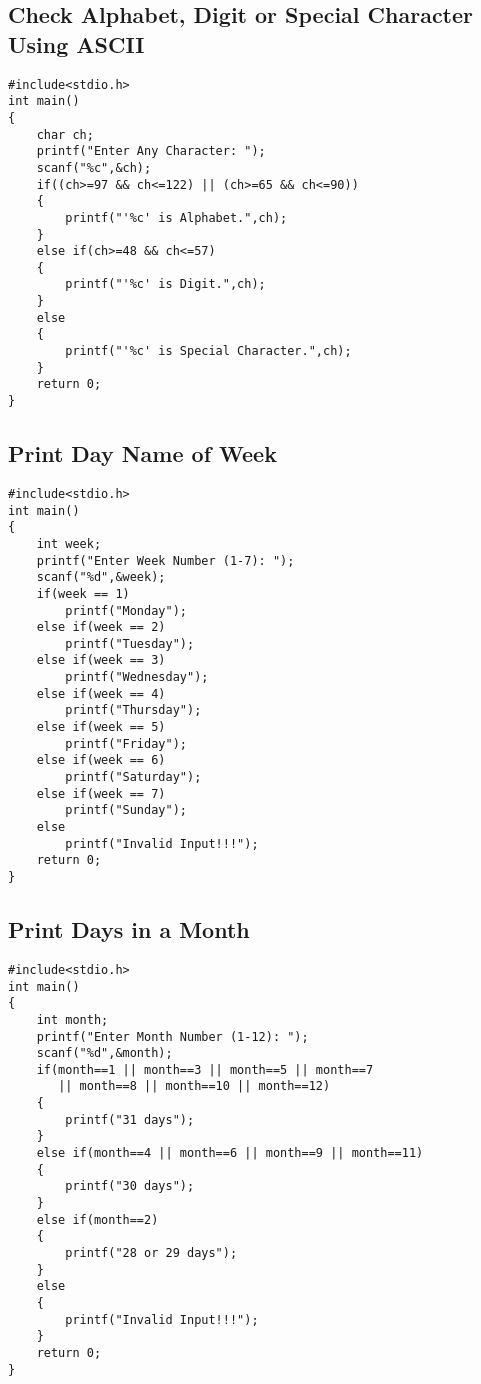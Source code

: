 \documentclass[a4paper,14pt]{article}
\begin{document}
\subsection{Check Alphabet, Digit or Special Character Using ASCII}
\vspace{0.5cm}
\begin{lstlisting}[caption={Check Alphabet, Digit or Special Character Using ASCII}]
#include<stdio.h>
int main()
{
    char ch;
    printf("Enter Any Character: ");
    scanf("%c",&ch);
    if((ch>=97 && ch<=122) || (ch>=65 && ch<=90))
    {
        printf("'%c' is Alphabet.",ch);
    }
    else if(ch>=48 && ch<=57)
    {
        printf("'%c' is Digit.",ch);
    }
    else
    {
        printf("'%c' is Special Character.",ch);
    }
    return 0;
}
\end{lstlisting}
\newpage

\subsection{Print Day Name of Week}
\vspace{0.5cm}
\begin{lstlisting}[caption={Print Day Name of Week}]
#include<stdio.h>
int main()
{
    int week;
    printf("Enter Week Number (1-7): ");
    scanf("%d",&week);
    if(week == 1)
        printf("Monday");
    else if(week == 2)
        printf("Tuesday");
    else if(week == 3)
        printf("Wednesday");
    else if(week == 4)
        printf("Thursday");
    else if(week == 5)
        printf("Friday");
    else if(week == 6)
        printf("Saturday");
    else if(week == 7)
        printf("Sunday");
    else
        printf("Invalid Input!!!");
    return 0;
}
\end{lstlisting}
\newpage

\subsection{Print Days in a Month}
\vspace{0.5cm}
\begin{lstlisting}[caption={Print Days in a Month}]
#include<stdio.h>
int main()
{
    int month;
    printf("Enter Month Number (1-12): ");
    scanf("%d",&month);
    if(month==1 || month==3 || month==5 || month==7 
       || month==8 || month==10 || month==12)
    {
        printf("31 days");
    }
    else if(month==4 || month==6 || month==9 || month==11)
    {
        printf("30 days");
    }
    else if(month==2)
    {
        printf("28 or 29 days");
    }
    else
    {
        printf("Invalid Input!!!");
    }
    return 0;
}
\end{lstlisting}
\newpage
\end{document}
